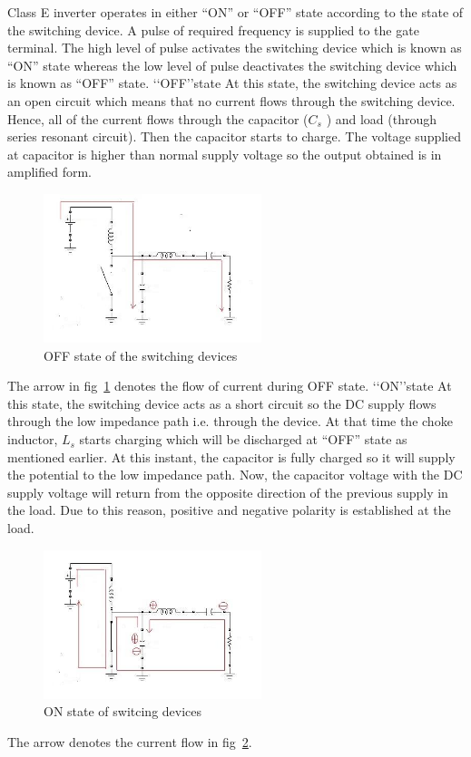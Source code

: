 \documentclass[journal,twoside]{IEEEtran}
\begin{document}
Class E inverter operates in either “ON” or “OFF” state
according to the state of the switching device. A pulse of
required frequency is supplied to the gate terminal. The high
level of pulse activates the switching device which is known
as “ON” state whereas the low level of pulse deactivates the
switching device which is known as “OFF” state.
\lq\lq OFF\rq\rq state
At this state, the switching device acts as an open circuit
which means that no current flows through the switching
device. Hence, all of the current flows through the capacitor
($C_s$ ) and load (through series resonant circuit). Then the
capacitor starts to charge. The voltage supplied at capacitor is higher than normal supply voltage so the output obtained is in
amplified form.\\
\begin{figure}[!ht]
\centering
\includegraphics[width=2.5in]{2}
\caption{OFF state of the switching devices}
\label{fig_2}
\end{figure}

The arrow in fig~\ref{fig_2} denotes the flow of current during OFF
state.
\lq\lq ON\rq\rq state
At this state, the switching device acts as a short circuit so the
DC supply flows through the low impedance path i.e. through
the device. At that time the choke inductor, $L_s$ starts charging
which will be discharged at “OFF” state as mentioned earlier.
At this instant, the capacitor is fully charged so it will supply
the potential to the low impedance path. Now, the capacitor
voltage with the DC supply voltage will return from the
opposite direction of the previous supply in the load. Due to
this reason, positive and negative polarity is established at the
load.


\begin{figure}[!ht]
\centering
\includegraphics[width=2.5in]{3}
\caption{ON state of switcing devices}
\label{fig_3}
\end{figure}
The arrow denotes the current flow in fig~\ref{fig_3}.
\end{document}
